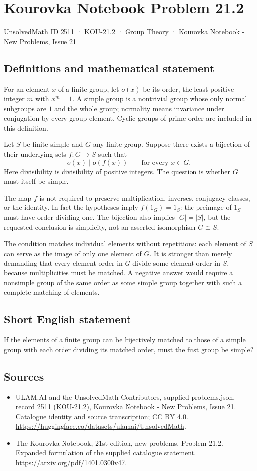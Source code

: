 \documentclass[11pt,a4paper]{article}
\begin{document}
\section*{Kourovka Notebook Problem 21.2}\label{2511}
{\small UnsolvedMath ID 2511 · KOU-21.2 · Group Theory · Kourovka Notebook - New Problems, Issue 21}
\subsection{Definitions and mathematical statement}
For an element $x$ of a finite group, let $o(x)$ be its order, the least
positive integer $m$ with $x^m=1$. A simple group is a nontrivial group
whose only normal subgroups are $1$ and the whole group; normality means
invariance under conjugation by every group element. Cyclic groups of
prime order are included in this definition.

Let $S$ be finite simple and $G$ any finite group. Suppose there exists
a bijection of their underlying sets $f:G\to S$ such that
\[
 o(x)\mid o(f(x))\qquad\text{for every }x\in G.
\]
Here divisibility is divisibility of positive integers. The question is
whether $G$ must itself be simple.

The map $f$ is not required to preserve multiplication, inverses,
conjugacy classes, or the identity. In fact the hypotheses imply
$f(1_G)=1_S$: the preimage of $1_S$ must have order dividing one.
The bijection also implies $|G|=|S|$, but the requested conclusion is
simplicity, not an asserted isomorphism $G\cong S$.

The condition matches individual elements without repetitions: each
element of $S$ can serve as the image of only one element of $G$.
It is stronger than merely demanding that every element order in $G$
divide some element order in $S$, because multiplicities must be matched.
A negative answer would require a nonsimple group of the same order as
some simple group together with such a complete matching of elements.
\subsection{Short English statement}
If the elements of a finite group can be bijectively matched to those of a simple group with each order dividing its matched order, must the first group be simple?
\subsection{Sources}
\begin{itemize}
\item[S1] ULAM.AI and the UnsolvedMath Contributors, supplied problems.json, record 2511 (KOU-21.2), Kourovka Notebook - New Problems, Issue 21. Catalogue identity and source transcription; CC BY 4.0.
\url{https://huggingface.co/datasets/ulamai/UnsolvedMath}.
\item[S2] The Kourovka Notebook, 21st edition, new problems, Problem 21.2. Expanded formulation of the supplied catalogue statement.
\url{https://arxiv.org/pdf/1401.0300v47}.
\end{itemize}
\end{document}
